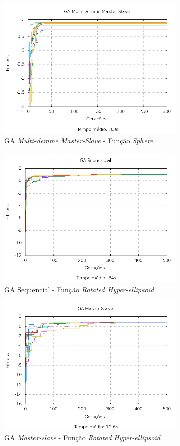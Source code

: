 \documentclass[12pt]{article}
\begin{document}
\begin{figure}[hp]
  \centering
  \includegraphics[width=0.8\textwidth]{msmd_f1.png}
  \caption{GA \emph{Multi-demme Master-Slave} - Função \emph{Sphere}}
\end{figure}


\begin{figure}[hp]
  \centering
  \includegraphics[width=0.8\textwidth]{seq_f2.png}
  \caption{GA Sequencial - Função \emph{Rotated Hyper-ellipsoid}}
\end{figure}

\begin{figure}[hp]
  \centering
  \includegraphics[width=0.8\textwidth]{ms_f2.png}
  \caption{GA \emph{Master-slave} - Função \emph{Rotated Hyper-ellipsoid}}
\end{figure}
\end{document}
